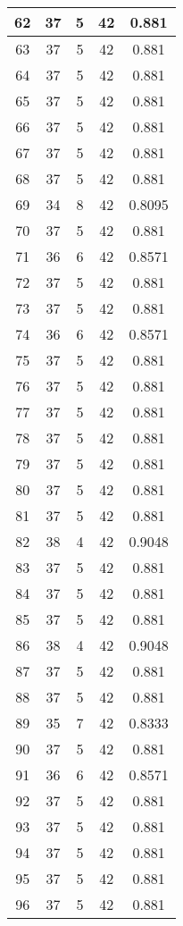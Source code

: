 \documentclass[letterpaper, 12pt]{article}
\begin{document}
\begin{longtable}{|c|c|c|c|c|}
\hline
62 & 37 & 5 & 42 & 0.881 \\
\hline
63 & 37 & 5 & 42 & 0.881 \\
\hline
64 & 37 & 5 & 42 & 0.881 \\
\hline
65 & 37 & 5 & 42 & 0.881 \\
\hline
66 & 37 & 5 & 42 & 0.881 \\
\hline
67 & 37 & 5 & 42 & 0.881 \\
\hline
68 & 37 & 5 & 42 & 0.881 \\
\hline
69 & 34 & 8 & 42 & 0.8095 \\
\hline
70 & 37 & 5 & 42 & 0.881 \\
\hline
71 & 36 & 6 & 42 & 0.8571 \\
\hline
72 & 37 & 5 & 42 & 0.881 \\
\hline
73 & 37 & 5 & 42 & 0.881 \\
\hline
74 & 36 & 6 & 42 & 0.8571 \\
\hline
75 & 37 & 5 & 42 & 0.881 \\
\hline
76 & 37 & 5 & 42 & 0.881 \\
\hline
77 & 37 & 5 & 42 & 0.881 \\
\hline
78 & 37 & 5 & 42 & 0.881 \\
\hline
79 & 37 & 5 & 42 & 0.881 \\
\hline
80 & 37 & 5 & 42 & 0.881 \\
\hline
81 & 37 & 5 & 42 & 0.881 \\
\hline
82 & 38 & 4 & 42 & 0.9048 \\
\hline
83 & 37 & 5 & 42 & 0.881 \\
\hline
84 & 37 & 5 & 42 & 0.881 \\
\hline
85 & 37 & 5 & 42 & 0.881 \\
\hline
86 & 38 & 4 & 42 & 0.9048 \\
\hline
87 & 37 & 5 & 42 & 0.881 \\
\hline
88 & 37 & 5 & 42 & 0.881 \\
\hline
89 & 35 & 7 & 42 & 0.8333 \\
\hline
90 & 37 & 5 & 42 & 0.881 \\
\hline
91 & 36 & 6 & 42 & 0.8571 \\
\hline
92 & 37 & 5 & 42 & 0.881 \\
\hline
93 & 37 & 5 & 42 & 0.881 \\
\hline
94 & 37 & 5 & 42 & 0.881 \\
\hline
95 & 37 & 5 & 42 & 0.881 \\
\hline
96 & 37 & 5 & 42 & 0.881 \\

\end{longtable}
\end{document}

